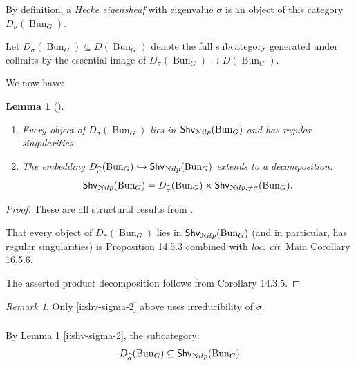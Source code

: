 \documentclass[reqno,11pt]{amsart}
\numberwithin{equation}{subsection}
\newtheorem{lem}[thm]{Lemma}
\theoremstyle{remark}
\newtheorem{rem}[thm]{Remark}
\newcommand{\into}{\hookrightarrow}
\newcommand{\sN}{{\EuScript N}}
\newcommand{\on}{\operatorname}
\newcommand{\Bun}{\on{Bun}}
\renewcommand{\subset}{\subseteq}
\newcommand{\Shv}{\mathsf{Shv}}
\newcommand{\Nilp}{\sN ilp}
\begin{document}
By definition, a \emph{Hecke eigensheaf} with eigenvalue $\sigma$ 
is an object of this category $D_{\sigma}(\Bun_G)$.

Let $D_{\widehat{\sigma}}(\Bun_G) \subset D(\Bun_G)$ denote the
full subcategory generated under colimits by the essential image
of $D_{\sigma}(\Bun_G) \to D(\Bun_G)$.

We now have:

\begin{lem}[\cite{agkrrv1}]\label{l:shv-sigma}

\begin{enumerate}

\item\label{i:shv-sigma-1} 
Every object of $D_{\widehat{\sigma}}(\Bun_G)$ lies in 
$\Shv_{\Nilp}(\Bun_G)$ and has regular singularities.

\item\label{i:shv-sigma-2} 
The embedding $D_{\widehat{\sigma}}(\Bun_G) \into \Shv_{\Nilp}(\Bun_G)$
extends to a decomposition:
%
\[
\Shv_{\Nilp}(\Bun_G) = 
D_{\widehat{\sigma}}(\Bun_G) \times \Shv_{\Nilp,\neq \sigma}(\Bun_G).
\]

\end{enumerate}

\end{lem}

\begin{proof}

These are all structural results from \cite{agkrrv1}. 

That every object of $D_{\widehat{\sigma}}(\Bun_G)$ lies in 
$\Shv_{\Nilp}(\Bun_G)$ (and in particular, has regular singularities) 
is \cite{agkrrv1} Proposition 14.5.3 combined with 
\emph{loc. cit}. Main Corollary 16.5.6.

The asserted product decomposition follows from \cite{agkrrv1} Corollary 14.3.5.

\end{proof}

\begin{rem}

Only \eqref{i:shv-sigma-2} above uses irreducibility of $\sigma$.

\end{rem}

\subsubsection{}

By Lemma \ref{l:shv-sigma} \eqref{i:shv-sigma-2}, the subcategory: 
%
\[
D_{\widehat{\sigma}}(\Bun_G) \subset \Shv_{\Nilp}(\Bun_G)
\]
\end{document}

